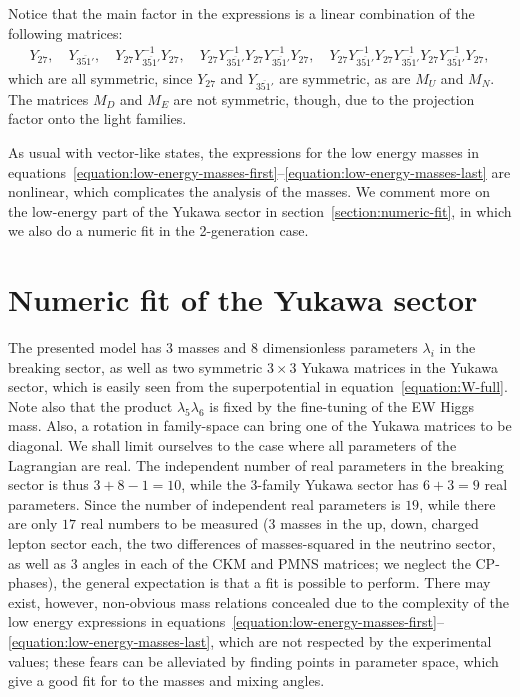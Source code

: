 \documentclass[a4paper,12pt]{article}
\def\yd{Y_{27}}
\def\yt{Y_{\overline{351'}}}
\begin{document}
Notice that the main factor in the expressions is a linear combination of the following matrices:
\begin{align}
\yd,\quad \yt,\quad \yd\yt^{-1}\yd, \quad \yd\yt^{-1}\yd\yt^{-1}\yd,\quad \yd\yt^{-1}\yd\yt^{-1}\yd\yt^{-1}\yd,
\end{align}
which are all symmetric, since $\yd$ and $\yt$ are symmetric, as are $M_U$ and $M_N$.
The matrices $M_D$ and $M_E$ are not symmetric, though, due to the projection factor onto the light families.



As usual with vector-like states, the expressions for the low energy masses in equations~\eqref{equation:low-energy-masses-first}--\eqref{equation:low-energy-masses-last} are nonlinear, which complicates the analysis of the masses. We comment more on the low-energy part of the Yukawa sector in section~\ref{section:numeric-fit}, in which we also do a numeric fit in the 2-generation case.


\section{Numeric fit of the Yukawa sector\label{section:numeric-fit}}
The presented model has $3$ masses and $8$ dimensionless parameters $\lambda_i$ in the breaking sector, as well as two symmetric $3\times 3$ Yukawa matrices in the Yukawa sector, which is easily seen from the superpotential in equation~\eqref{equation:W-full}. Note also that the product $\lambda_5\lambda_6$ is fixed by the fine-tuning of the EW Higgs mass. Also, a rotation in family-space can bring one of the Yukawa matrices to be diagonal. We shall limit ourselves to the case where all parameters of the Lagrangian are real. The independent number of real parameters in the breaking sector is thus $3+8-1=10$, while the $3$-family Yukawa sector has $6+3=9$ real parameters. Since the number of independent real parameters is $19$, while there are only $17$ real numbers to be measured ($3$ masses in the up, down, charged lepton sector each, the two differences of masses-squared in the neutrino sector, as well as $3$ angles in each of the CKM and PMNS matrices; we neglect the CP-phases), the general expectation is that a fit is possible to perform. There may exist, however, non-obvious mass relations concealed due to the complexity of the low energy expressions in equations~\eqref{equation:low-energy-masses-first}--\eqref{equation:low-energy-masses-last}, which are not respected by the experimental values; these fears can be alleviated by finding points in parameter space, which give a good fit for to the masses and mixing angles.
\end{document}
